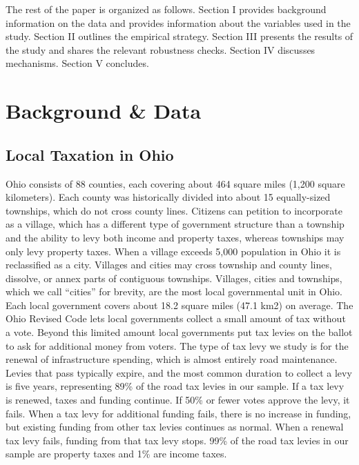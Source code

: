 The rest of the paper is organized as follows. Section I provides background information on the data and provides information about the variables used in the study. Section II outlines the empirical strategy. Section III presents the results of the study and shares the relevant robustness checks. Section IV discusses mechanisms. Section V concludes.

\section{Background \& Data}  \label{sec:data}


\subsection{Local Taxation in Ohio}

Ohio consists of 88 counties, each covering about 464 square miles (1,200 square kilometers).  Each county was historically divided into about 15 equally-sized townships, which do not cross county lines.  Citizens can petition to incorporate as a village, which has a different type of government structure than a township and the ability to levy both income and property taxes, whereas townships may only levy property taxes.  When a village exceeds 5,000 population in Ohio it is reclassified as a city.  Villages and cities may cross township and county lines, dissolve, or annex parts of contiguous townships.  Villages, cities and townships, which we call “cities” for brevity, are the most local governmental unit in Ohio. Each local government covers about 18.2 square miles (47.1 km2) on average. The Ohio Revised Code lets local governments collect a small amount of tax without a vote.  Beyond this limited amount local governments put tax levies on the ballot to ask for additional money from voters.  
The type of tax levy we study is for the renewal of infrastructure spending, which is almost entirely road maintenance.  Levies that pass typically expire, and the most common duration to collect a levy is five years, representing 89\% of the road tax levies in our sample.  If a tax levy is renewed, taxes and funding continue.  If 50\% or fewer votes approve the levy, it fails.  When a tax levy for additional funding fails, there is no increase in funding, but existing funding from other tax levies continues as normal.  When a renewal tax levy fails, funding from that tax levy stops.  99\% of the road tax levies in our sample are property taxes and 1\% are income taxes.

